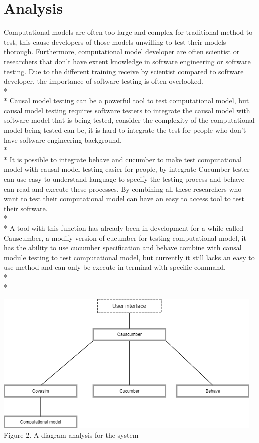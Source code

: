 \chapter{Analysis}
Computational models are often too large and complex for traditional method to test, this cause developers of those models unwilling to test their models thorough. Furthermore, computational model developer are often scientist or researchers that don’t have extent knowledge in software engineering or software testing. Due to the different training receive by scientist compared to software developer, the importance of software testing is often overlooked.  \\*\\*
Causal model testing can be a powerful tool to test computational model, but causal model testing requires software testers to integrate the causal model with software model that is being tested, consider the complexity of the computational model being tested can be, it is hard to integrate the test for people who don’t have software engineering background. \\*\\*
It is possible to integrate behave and cucumber to make test computational model with causal model testing easier for people, by integrate Cucumber tester can use easy to understand language to specify the testing process and behave can read and execute these processes. By combining all these researchers who want to test their computational model can have an easy to access tool to test their software. \\*\\*
A tool with this function has already been in development for a while called Causcumber, a modify version of cucumber for testing computational model, it has the ability to use cucumber specification and behave combine with causal module testing to test computational model, but currently it still lacks an easy to use method and can only be execute in terminal with specific command. \\*\\*


\begin{center}
	\includegraphics[width=13cm]{figures/Analysis.png}\\
	Figure 2. A diagram analysis for the system
\end{center}
